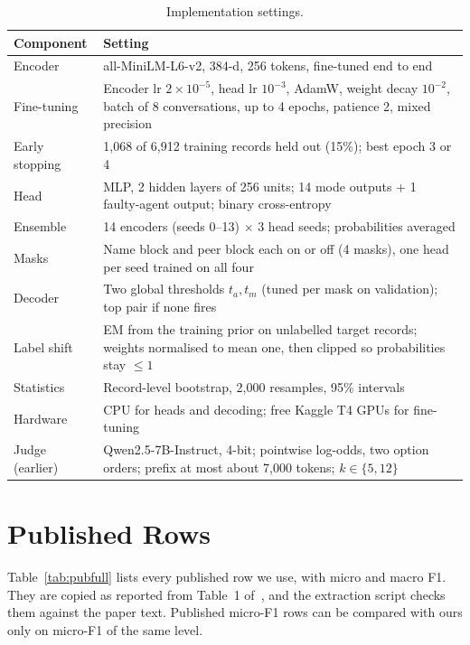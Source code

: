 \documentclass[conference]{IEEEtran}
\begin{document}
\begin{table}[t]
\caption{Implementation settings.}
\label{tab:settings}
\centering\footnotesize
\begin{tabularx}{\columnwidth}{@{}l Y@{}}
\toprule
Component & Setting \\
\midrule
Encoder & all-MiniLM-L6-v2, 384-d, 256 tokens, fine-tuned end to end \\
Fine-tuning & Encoder lr $2\times10^{-5}$, head lr $10^{-3}$, AdamW, weight decay $10^{-2}$, batch of 8 conversations, up to 4 epochs, patience 2, mixed precision \\
Early stopping & 1,068 of 6,912 training records held out (15\%); best epoch 3 or 4 \\
Head & MLP, 2 hidden layers of 256 units; 14 mode outputs + 1 faulty-agent output; binary cross-entropy \\
Ensemble & 14 encoders (seeds 0--13) $\times$ 3 head seeds; probabilities averaged \\
Masks & Name block and peer block each on or off (4 masks), one head per seed trained on all four \\
Decoder & Two global thresholds $t_a,t_m$ (tuned per mask on validation); top pair if none fires \\
Label shift & EM from the training prior on unlabelled target records; weights normalised to mean one, then clipped so probabilities stay $\le 1$ \\
Statistics & Record-level bootstrap, 2,000 resamples, 95\% intervals \\
Hardware & CPU for heads and decoding; free Kaggle T4 GPUs for fine-tuning \\
Judge (earlier) & Qwen2.5-7B-Instruct, 4-bit; pointwise log-odds, two option orders; prefix at most about 7,000 tokens; $k\in\{5,12\}$ \\
\bottomrule
\end{tabularx}
\end{table}

\section{Published Rows}
Table~\ref{tab:pubfull} lists every published row we use, with micro and macro F1. They are copied as reported from Table~1 of~\cite{aegis}, and the extraction script checks them against the paper text. Published micro-F1 rows can be compared with ours only on micro-F1 of the same level.
\end{document}
